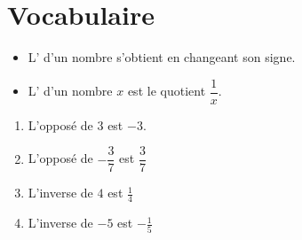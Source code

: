 \section{Vocabulaire}

\begin{definition}
    \begin{itemize}
        \item L' d'un nombre s'obtient en changeant son signe.
        \item L' d'un nombre \( x\) est le quotient \( \dfrac{ 1 }{ x }\).
    \end{itemize}
\end{definition}

\begin{example}
    \begin{enumerate}
        \item
            L'opposé de \( 3\) est \( -3\).
        \item
            L'opposé de \( -\dfrac{ 3 }{ 7 }\) est \( \dfrac{ 3 }{ 7 }\)
        \item
            L'inverse de \( 4\) est \( \frac{1}{ 4 }\)
        \item
            L'inverse de \( -5\) est \( -\frac{1}{ 5 }\)
    \end{enumerate}
\end{example}
